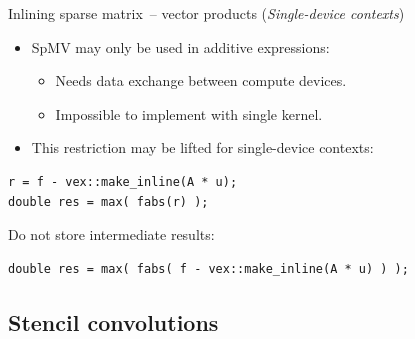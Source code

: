 \documentclass[@BEAMER_OPTIONS@]{beamer}
\newcommand{\singledevice}{\hspace{1cm}\footnotesize(\emph{Single-device contexts})}
\begin{document}
\begin{frame}[fragile]{Inlining sparse matrix~-- vector products \singledevice}
    \begin{itemize}
        \item SpMV may only be used in additive expressions:
            \begin{itemize}
                \item Needs data exchange between compute devices.
                \item Impossible to implement with single kernel.
            \end{itemize}
        \item This restriction may be lifted for single-device contexts:
    \end{itemize}
    \begin{exampleblock}{}
        \begin{lstlisting}[numbers=none]
r = f - vex::make_inline(A * u);
double res = max( fabs(r) );
        \end{lstlisting}
    \end{exampleblock}
    \pause
    \begin{exampleblock}{Do not store intermediate results:}
        \begin{lstlisting}[numbers=none]
double res = max( fabs( f - vex::make_inline(A * u) ) );
        \end{lstlisting}
    \end{exampleblock}
\end{frame}

\note{ }

\subsection{Stencil convolutions}
\end{document}
